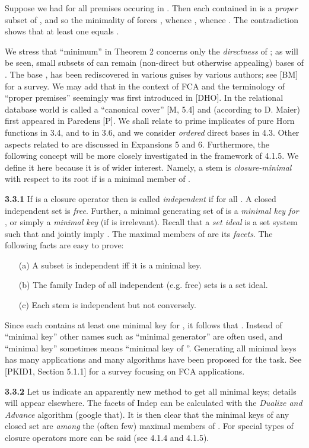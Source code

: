 \documentclass[11pt]{article}
\begin{document}
Suppose we had  for all premises  occuring in . Then each  contained in  is a {\it proper} subset of , and so the minimality of  forces , whence , whence . The contradiction  shows that at least one  equals .  \quad 

We stress that ``minimum'' in Theorem 2 concerns only the {\it directness} of ; as will be seen, small subsets of  can remain (non-direct but otherwise appealing) bases of .  The base , has been rediscovered in various guises by various authors; see [BM] for a survey. We may add that in the context of FCA and the terminology of ``proper premises''  seemingly was first introduced in [DHO]. In the relational database world  is called a ``canonical cover'' [M, 5.4] and (according to D. Maier) first appeared in Paredens [P].
We shall relate  to prime implicates of pure Horn functions in 3.4, and to  in 3.6, and we consider {\it ordered} direct bases in 4.3. Other aspects related to  are discussed in Expansions 5 and 6. Furthermore, the following concept will be more closely investigated in the framework of 4.1.5. We define it here because it is of wider interest. Namely, a stem  is {\it closure-minimal} with respect to its root  if  is a minimal member of .


{\bf 3.3.1} If  is a closure operator then  is called {\it independent} if   for all . A closed independent set is {\it free}. Further, a minimal generating set  of  is a {\it minimal key for} , or simply a {\it minimal key} (if  is irrelevant). Recall that a {\it set ideal} is a set system  such that  and  jointly imply . The maximal members of  are its {\it facets}. The following facts  are easy to prove:
\begin{enumerate}
	\item [(a)] A subset is independent iff it is a minimal key.
	\item[(b)] The family Indep of all independent (e.g. free) sets is a set ideal.
	\item[(c)] Each stem is independent  but not conversely.
\end{enumerate}
Since each  contains at least one minimal key for , it follows that .
 Instead of ``minimal key'' other names such as ``minimal generator'' are often used, and ``minimal key'' sometimes means ``minimal key of ''. Generating all minimal keys has many applications and many algorithms have been proposed for the task. See [PKID1, Section 5.1.1] for a survey focusing on FCA applications.

{\bf 3.3.2} Let us indicate an apparently new method to get all minimal keys; details will appear elsewhere. The facets  of Indep can be calculated with the {\it Dualize and Advance} algorithm (google that). It is then clear that the minimal keys of any closed set  are {\it among} the (often few) maximal members of . For special types of closure operators more can be said (see 4.1.4 and 4.1.5).
\end{document}
